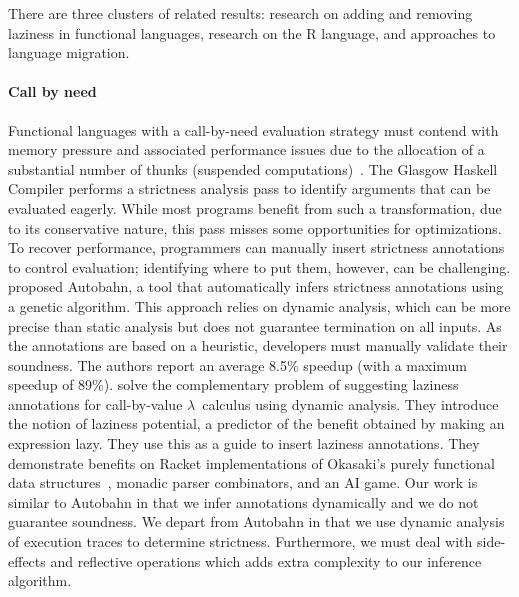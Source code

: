 \documentclass[review,creen,acmsmall]{acmart}
\begin{document}
There are three clusters of related results: research on adding and removing
laziness in functional languages, research on the R language, and approaches to
language migration.

\paragraph{Call by need} Functional languages with a call-by-need evaluation
strategy must contend with memory pressure and associated performance issues due
to the allocation of a substantial number of thunks (suspended
computations)~\cite{transformopt,stricteffective,opteval}. The Glasgow Haskell
Compiler performs a strictness analysis pass to identify arguments that can be
evaluated eagerly. While most programs benefit from such a transformation, due
to its conservative nature, this pass misses some opportunities for
optimizations. To recover performance, programmers can manually insert
strictness annotations to control evaluation; identifying where to put them,
however, can be challenging. \citet{autobahn} proposed Autobahn, a tool that
automatically infers strictness annotations using a genetic algorithm. This
approach relies on dynamic analysis, which can be more precise than static
analysis but does not guarantee termination on all inputs. As the annotations
are based on a heuristic, developers must manually validate their soundness. The
authors report an average 8.5\% speedup (with a maximum speedup of 89\%).
\citet{lazyprof} solve the complementary problem of suggesting laziness
annotations for call-by-value $\lambda$~calculus using dynamic analysis. They
introduce the notion of laziness potential, a predictor of the benefit obtained
by making an expression lazy. They use this as a guide to insert laziness
annotations. They demonstrate benefits on Racket implementations of Okasaki's
purely functional data structures~\cite{oka95}, monadic parser combinators, and
an AI game. Our work is similar to Autobahn in that we infer annotations
dynamically and we do not guarantee soundness. We depart from Autobahn in that
we use dynamic analysis of execution traces to determine strictness.
Furthermore, we must deal with side-effects and reflective operations which adds
extra complexity to our inference algorithm.
\end{document}
